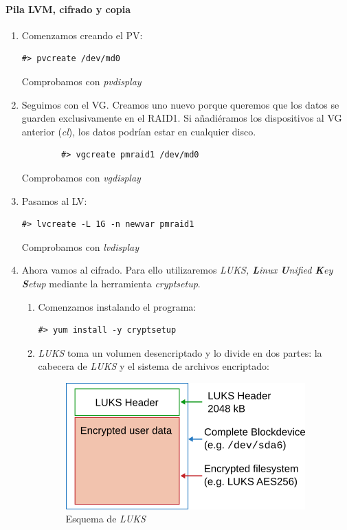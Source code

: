 \documentclass[12pt,spanish]{article}
\begin{document}
\paragraph{Pila LVM, cifrado y copia}
\begin{enumerate}
	\item Comenzamos creando el PV:
		\begin{lstlisting}[xleftmargin=-1.5cm]
			#> pvcreate /dev/md0
		\end{lstlisting}
	Comprobamos con \textit{pvdisplay}
	\item Seguimos con el VG. Creamos uno nuevo porque queremos que los datos se guarden exclusivamente en el RAID1. Si añadiéramos los dispositivos al VG anterior (\textit{cl}), los datos podrían estar en cualquier disco.
	\begin{lstlisting}
		#> vgcreate pmraid1 /dev/md0
	\end{lstlisting}
	Comprobamos con \textit{vgdisplay}
	\item Pasamos al LV:
		\begin{lstlisting}[xleftmargin=-1.5cm]
			#> lvcreate -L 1G -n newvar pmraid1
		\end{lstlisting}
	Comprobamos con \textit{lvdisplay}
	\item Ahora vamos al cifrado. Para ello utilizaremos \textit{LUKS, \textbf{L}inux \textbf{U}nified \textbf{K}ey \textbf{S}etup} mediante la herramienta \textit{cryptsetup}.
	\begin{enumerate}
		\item Comenzamos instalando el programa:
			\begin{lstlisting}[xleftmargin=-3.8cm]
				#> yum install -y cryptsetup
			\end{lstlisting}
			\item \textit{LUKS} toma un volumen desencriptado y lo divide en dos partes: la cabecera de \textit{LUKS} y el sistema de archivos encriptado:
			\begin{figure}[H]
				\centering
				\includegraphics{luks.png}
				\caption{Esquema de \textit{LUKS}}

\end{figure}
\end{enumerate}
\end{enumerate}
\end{document}
